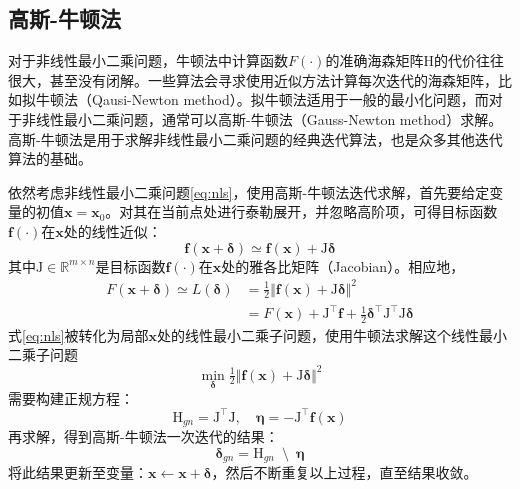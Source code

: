 \subsection{高斯-牛顿法}\label{sec:gn}

对于非线性最小二乘问题，牛顿法中计算函数$F(\cdot)$的准确海森矩阵$\mathrm{H}$的代价往往很大，甚至没有闭解。一些算法会寻求使用近似方法计算每次迭代的海森矩阵，比如拟牛顿法\citep{tingleff2004methods}（Qausi-Newton method）。拟牛顿法适用于一般的最小化问题，而对于非线性最小二乘问题，通常可以高斯-牛顿法（Gauss-Newton method）求解。高斯-牛顿法是用于求解非线性最小二乘问题的经典迭代算法，也是众多其他迭代算法的基础。

依然考虑非线性最小二乘问题\eqref{eq:nls}，使用高斯-牛顿法迭代求解，首先要给定变量的初值$\bm{x}=\bm{x}_0$。对其在当前点处进行泰勒展开，并忽略高阶项，可得目标函数$\bm{f}(\cdot)$在$\bm{x}$处的线性近似：
\begin{equation}
    \bm{f}(\bm{x}+\bm{\delta}) \simeq \bm{f}(\bm{x}) + \mathrm{J}\bm{\delta}
\end{equation}
其中$\mathrm{J}\in\mathbb{R}^{m \times n}$是目标函数$\bm{f}(\cdot)$在$\bm{x}$处的雅各比矩阵（Jacobian）。相应地，
\begin{equation}
\begin{aligned}
    F(\bm{x}+\bm{\delta}) \simeq L(\bm{\delta})
        &= \tfrac{1}{2} \Vert \bm{f}(\bm{x}) + \mathrm{J}\bm{\delta} \Vert^2 \\
        &= F(\bm{x}) + \mathrm{J}^\top\bm{f} +
           \tfrac{1}{2}\bm{\delta}^\top\mathrm{J}^\top\mathrm{J}\bm{\delta}
\end{aligned}
\label{eq:linmod}
\end{equation}
式\eqref{eq:nls}被转化为局部$\bm{x}$处的线性最小二乘子问题，使用牛顿法求解这个线性最小二乘子问题
\begin{equation}
    \min_{\bm{\delta}} \tfrac{1}{2}
    \Vert \bm{f}(\bm{x}) + \mathrm{J}\bm{\delta} \Vert^2
    \label{eq:lls}
\end{equation}
需要构建正规方程：
\begin{equation}
    \mathrm{H}_{gn} = \mathrm{J}^\top\mathrm{J}, \quad
    \bm{\eta}       = -\mathrm{J}^\top\bm{f}(\bm{x})
    \label{eq:normal_eq}
\end{equation}
再求解，得到高斯-牛顿法一次迭代的结果：
\begin{equation}
    \bm{\delta}_{gn} = \mathrm{H}_{gn} \enspace\setminus\enspace \bm{\eta}
    \label{eq:gn}
\end{equation}
将此结果更新至变量：$\bm{x}\leftarrow\bm{x}+\bm{\delta}$，然后不断重复以上过程，直至结果收敛。

